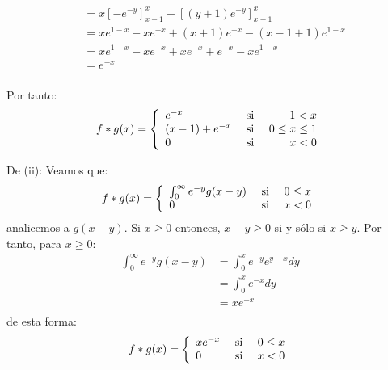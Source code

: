 \documentclass[12pt]{report}
\newcounter{it}
\theoremstyle{largebreak}
\begin{document}
\begin{sol}
\begin{itemize}
\begin{equation*}
\begin{split}
                    &=x\left[-e^{-y} \right]_{x-1}^x+\left[(y+1)e^{-y}\right]_{x-1}^x \\
                    &=xe^{1-x}-xe^{-x}+(x+1)e^{-x}-(x-1+1)e^{1-x}\\
                    &=xe^{1-x}-xe^{-x}+xe^{-x}+e^{-x}-xe^{1-x}\\
                    &=e^{-x}\\
                \end{split}
            \end{equation*}
        \end{itemize}
        Por tanto:
        \begin{equation*}
            f*g(x)=\left\{
                \begin{array}{lcr}
                    e^{-x} & \textup{ si } & 1<x \\
                    (x-1)+e^{-x} & \textup{ si } & 0\leq x \leq1 \\
                    0 & \textup{ si } & x<0\\ 
                \end{array}
            \right.
        \end{equation*}

        De (ii): Veamos que:
        \begin{equation*}
            f*g(x)=\left\{
                \begin{array}{lcr}
                    \int_0^\infty e^{-y}g(x-y) & \textup{ si } & 0\leq x \\
                    0 & \textup{ si } & x<0\\ 
                \end{array}
            \right.
        \end{equation*}
        analicemos a $g(x-y)$. Si $x\geq 0$ entonces, $x-y\geq 0$ si y sólo si $x\geq y$. Por tanto, para $x\geq 0$:
        \begin{equation*}
            \begin{split}
                \int_0^\infty e^{-y}g(x-y)&=\int_0^x e^{-y}e^{y-x}dy\\
                &=\int_0^x e^{-x}dy\\
                &=xe^{-x}\\
            \end{split}
        \end{equation*}
        de esta forma:
        \begin{equation*}
            f*g(x)=\left\{
                \begin{array}{lcr}
                    xe^{-x} & \textup{ si } & 0\leq x \\
                    0 & \textup{ si } & x<0\\ 
                \end{array}
            \right.
        \end{equation*}


\end{sol}
\end{document}

